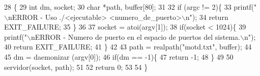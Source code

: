 \begin{DoxyCode}
28                                 \{
29         \textcolor{keywordtype}{int} dm, socket;
30         \textcolor{keywordtype}{char} *path, buffer[80];
31 
32         \textcolor{keywordflow}{if} (argc != 2)\{
33                 printf(\textcolor{stringliteral}{"\(\backslash\)nERROR - Uso ./<ejecutable> <numero\_de\_puerto>\(\backslash\)n"});
34                 \textcolor{keywordflow}{return} EXIT\_FAILURE;
35         \}
36 
37         socket = atoi(argv[1]);
38         \textcolor{keywordflow}{if}(socket < 1024)\{
39                 printf(\textcolor{stringliteral}{"\(\backslash\)nERROR - Numero de puerto en el espacio de puertos del sistema.\(\backslash\)n"});
40                 \textcolor{keywordflow}{return} EXIT\_FAILURE;
41         \}
42         
43         path = realpath(\textcolor{stringliteral}{"motd.txt"}, buffer);    
44         
45         dm  = daemonizar (argv[0]);
46         \textcolor{keywordflow}{if}(dm == -1)\{
47                 \textcolor{keywordflow}{return} -1;
48         \}
49 
50         servidor(socket, path);
51 
52         \textcolor{keywordflow}{return} 0;
53 
54 \}
\end{DoxyCode}
